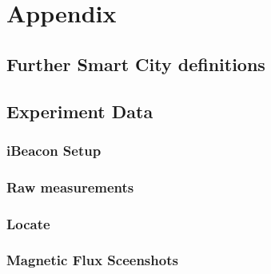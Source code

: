 


\renewcommand{\thesubsection}{\Alph{subsection}}

\section*{Appendix}

\subsection{Further Smart City definitions}


\subsection{Experiment Data}

\subsubsection{iBeacon Setup}

\subsubsection{Raw measurements}

\subsubsection{Locate}

\subsubsection{Magnetic Flux Sceenshots}



